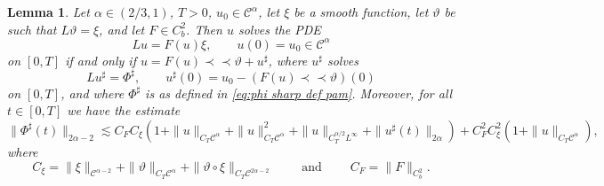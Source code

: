 \documentclass[11pt,a4paper]{article}
\newcommand{\precprec}{\prec\!\!\!\prec}
\newcommand{\tmop}[1]{\ensuremath{\operatorname{#1}}}
\newtheorem{lemma}[theorem]{Lemma}
\theoremstyle{remark}
\newcommand{\CC}{\ensuremath{\mathscr{C}}}
\begin{document}
\begin{lemma}
  Let $\alpha \in (2/3, 1)$, $T>0$, $u_0 \in \CC^\alpha$, let $\xi$ be a smooth function, let $\vartheta$ be such that $L \vartheta = \xi$, and let $F \in C^{2}_{b}$. Then
  $u$ solves the PDE
  \[
     L u=F ( u ) \xi , \hspace{2em} u ( 0 ) =u_{0} \in \CC^\alpha
  \]
  on $[ 0,T ]$ if and only if $u=F ( u ) \precprec \vartheta +u^{\sharp}$,
  where $u^{\sharp}$ solves
  \[
     L u^{\sharp} = \Phi^{\sharp} , \hspace{2em} u^{\sharp} ( 0 ) =u_{0} - ( F ( u ) \precprec \vartheta ) ( 0 )
  \]
  on $[ 0,T ]$, and where $\Phi^{\sharp}$ is as defined in {\eqref{eq:phi
  sharp def pam}}. Moreover, for all $t \in [ 0,T ]$ we have the estimate
  \begin{equation}\label{eq:phi sharp estimate pam}
     \| \Phi^{\sharp} ( t ) \|_{2 \alpha -2} \lesssim C_{F} C_{\xi} ( 1+ \| u \|_{C_{T} \CC^\alpha} + \| u \|_{C_{T} \CC^\alpha}^{2} + \| u \|_{C^{\alpha /2}_{T} L^{\infty}} + \| u^{\sharp} ( t ) \|_{2 \alpha} ) +C_{F}^{2} C_{\xi}^{2} ( 1+ \| u \|_{C_{T} \CC^\alpha} ) ,
  \end{equation}
  where
  \[
     C_{\xi} = \| \xi \|_{\CC^{\alpha -2}} + \| \vartheta \|_{C_{T} \CC^\alpha} + \| \vartheta \circ   \xi \|_{C_{T} \CC^{2 \alpha -2}} \hspace{2em} \tmop{and} \hspace{2em} C_{F} = \| F \|_{C^{2}_{b}}.
  \]
\end{lemma}
\end{document}
